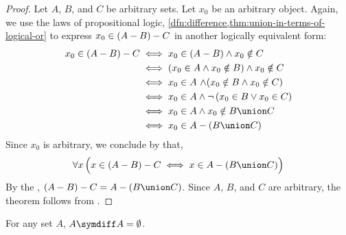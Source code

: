 \begin{proof}
    Let \( A \), \( B \), and \( C \) be arbitrary sets. Let \( x_{0} \) be an arbitrary object. Again, we use
    the laws of propositional logic, \cref{dfn:difference,thm:union-in-terms-of-logical-or} to express
    \( x_{0} \in \mleft( A - B \mright) - C \) in another logically equivalent form:
    \begin{align*}
        x_{0} \in \mleft( A - B \mright) - C
        &\iff
        x_{0} \in \mleft( A - B \mright) \land x_{0} \notin C \\
        &\iff
        \mleft( x_{0} \in A \land x_{0} \notin B \mright)
        \land
        x_{0} \notin C\\
        &\iff
        x_{0} \in A \,\,{\land} \mleft( x_{0} \notin B \land x_{0} \notin C \mright)\\
        &\iff
        x_{0} \in A \land \lnot \, \mleft( x_{0} \in B \lor x_{0} \in C \mright)\\
        &\iff
        x_{0} \in A \land x_{0} \notin B \union C\\
        &\iff
        x_{0} \in A - \mleft( B \union C \mright)
    \end{align*}
    Since \( x_{0} \) is arbitrary, we conclude by  that,
    \begin{equation*}
        \forall x \, \Big( x \in \mleft( A - B \mright) - C \iff
        x \in A - \mleft( B \union C \mright) \Big)
    \end{equation*}
    By the , \( \mleft( A - B \mright) - C = A - \mleft( B \union  C \mright)\).
    Since \( A \), \( B \), and \( C \) are arbitrary, the theorem follows from .
\end{proof}

\begin{thm}[Nilpotence]
    \label{set-identities:symmetric-difference-of-any-set-with-itself-is-empty}
    For any set \( A \), \( A \symdiff A = \emptyset \).
\end{thm}


